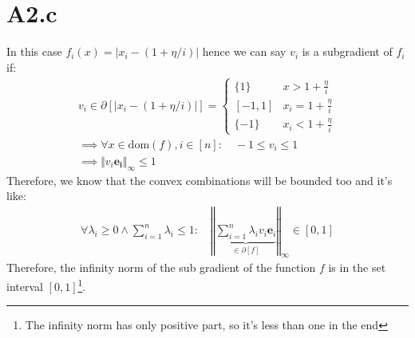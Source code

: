 \documentclass[]{article}
\begin{document}
\section*{A2.c}
    In this case $f_i(x) = |x_i - (1 + \eta/i)|$ hence we can say $v_i$ is a subgradient of $f_i$ if:
    \begin{align*}\tag{A2.c.1}\label{eqn:A2.c.1}
        v_i \in \partial[|x_i - (1 + \eta/i)|] = \begin{cases}
            \{1\} & x > 1 + \frac{\eta}{i} 
            \\
            [-1, 1] & x_i = 1 + \frac{\eta}{i}
            \\
            \{-1\} & x_i < 1 + \frac{\eta}{i}
        \end{cases}
        \\
        \implies \forall x\in \text{dom}(f), i\in [n]: \quad
        -1 \le v_i \le 1
        \\
        \implies \Vert v_i\mathbf{e_i}\Vert_\infty \le 1
    \end{align*}
    Therefore, we know that the convex combinations will be bounded too and it's like: 
    \begin{align*}\tag{A2.c.2}\label{eqn:A2.c.2}
        \forall \lambda_i \ge 0 \wedge \sum_{i = 1}^{n}\lambda_i \le 1:
        \quad 
        \left\Vert 
            \underbrace{\sum_{i = 1}^{n}\lambda_iv_i\mathbf{e}_i}_{\in \partial[f]} 
        \right\Vert_\infty \in [0, 1]
    \end{align*}
    Therefore, the infinity norm of the sub gradient of the function $f$ is in the set interval $[0, 1]$\footnote{The infinity norm has only positive part, so it's less than one in the end}. 
\end{document}
